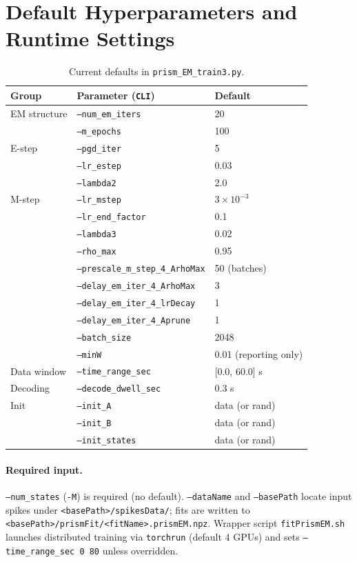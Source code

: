 \documentclass[11pt]{article}
\begin{document}
\section{Default Hyperparameters and Runtime Settings}
\label{sec:defaults}

\begin{table}[h]
\centering
\begin{tabular}{lll}
\toprule
Group & Parameter (\texttt{CLI}) & Default \\
\midrule
EM structure & \texttt{--num\_em\_iters} & 20 \\
 & \texttt{--m\_epochs} & 100 \\
E-step & \texttt{--pgd\_iter} & 5 \\
 & \texttt{--lr\_estep} & 0.03 \\
 & \texttt{--lambda2} & 2.0 \\
M-step & \texttt{--lr\_mstep} & \(3 \times 10^{-3}\) \\
 & \texttt{--lr\_end\_factor} & 0.1 \\
 & \texttt{--lambda3} & 0.02 \\
 & \texttt{--rho\_max} & 0.95 \\
 & \texttt{--prescale\_m\_step\_4\_ArhoMax} & 50 (batches) \\
 & \texttt{--delay\_em\_iter\_4\_ArhoMax} & 3 \\
 & \texttt{--delay\_em\_iter\_4\_lrDecay} & 1 \\
 & \texttt{--delay\_em\_iter\_4\_Aprune} & 1 \\
 & \texttt{--batch\_size} & 2048 \\
 & \texttt{--minW} & 0.01 (reporting only)\\
Data window & \texttt{--time\_range\_sec} & [0.0, 60.0] s \\
Decoding & \texttt{--decode\_dwell\_sec} & 0.3 s \\
Init & \texttt{--init\_A} & data (or rand)\\
 & \texttt{--init\_B} & data (or rand) \\
 & \texttt{--init\_states} & data (or rand) \\
\bottomrule
\end{tabular}
\caption{Current defaults in \texttt{prism\_EM\_train3.py}.}
\end{table}

\paragraph{Required input.}
\texttt{--num\_states} (\texttt{-M}) is required (no default).
\texttt{--dataName} and \texttt{--basePath} locate input spikes under
\texttt{<basePath>/spikesData/}; fits are written to
\texttt{<basePath>/prismFit/<fitName>.prismEM.npz}.
Wrapper script \texttt{fitPrismEM.sh} launches distributed training via
\texttt{torchrun} (default 4 GPUs) and sets
\texttt{--time\_range\_sec 0 80} unless overridden.
\end{document}
